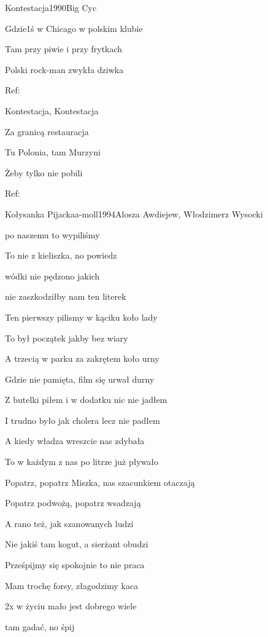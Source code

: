 \documentclass[a4paper,draft]{book}
\begin{document}
\begin{song}{Kontestacja}{}{1990}{Big Cyc}{}{}
\begin{SBVerse}
	Gdzie1ś w Chicago w polskim klubie

	Tam przy piwie i przy frytkach

	Polski rock-man zwykła dziwka
	\end{SBVerse}
	\begin{SBChorus}
	Ref:
	\end{SBChorus}
	\begin{SBVerse}
	Kontestacja, Kontestacja

	Za granicą restauracja

	Tu Polonia, tam Murzyni

	Żeby tylko nie pobili
	\end{SBVerse}
	\begin{SBChorus}
	Ref:
	\end{SBChorus}
\end{song}

\begin{song}{Kołysanka Pijacka}{a-moll}{1994}{Alosza Awdiejew, Włodzimerz Wysocki}{}{}
	\begin{SBVerse}
	 po naszemu to wypiliśmy 

	To nie z kieliszka, no powiedz  

	 wódki nie pędzono jakich 

	 nie zaszkodziłby nam ten literek 
	\end{SBVerse}
	\begin{SBVerse}
	Ten pierwszy pilismy w kąciku koło lady

	To był początek jakby bez wiary

	A trzecią w parku za zakrętem koło urny

	Gdzie nie pamięta, film się urwał durny
	\end{SBVerse}
	\begin{SBVerse}
	Z butelki piłem i w dodatku nic nie jadłem

	I trudno było jak cholera lecz nie padłem

	A kiedy władza wreszcie nas zdybała

	To w każdym z nas po litrze już pływało
	\end{SBVerse}
	\begin{SBVerse}
	Popatrz, popatrz Miszka, nas szacunkiem otaczają

	Popatrz podwożą, popatrz wsadzają

	A rano też, jak szanowanych ludzi

	Nie jakiś tam kogut, a sierżant obudzi
	\end{SBVerse}
	\begin{SBVerse}
	Prześpijmy się spokojnie to nie praca

	Mam trochę forsy, złagodzimy kaca
	\end{SBVerse}
	\begin{SBBracket}{2x}
	 w życiu mało jest dobrego wiele 

	 tam gadać, no śpij  
	\end{SBBracket}
\end{song}
\end{document}
